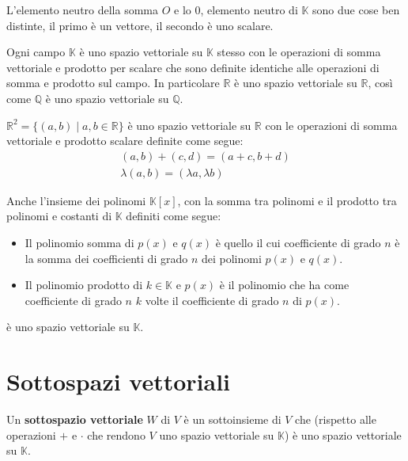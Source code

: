\begin{observation}
	L'elemento neutro della somma $O$ e lo $0$, elemento neutro di $\mathbb{K}$
	sono due cose ben distinte, il primo è un vettore, il secondo è uno scalare.
\end{observation}

\begin{example}
	Ogni campo $\mathbb{K}$ \`e uno spazio vettoriale su $\mathbb{K}$
	stesso con le operazioni di somma vettoriale e prodotto per scalare
	che sono definite identiche alle operazioni di somma e prodotto sul
	campo. In particolare $\mathbb{R}$ \`e uno spazio vettoriale
	su $\mathbb{R}$, cos\`i come $\mathbb{Q}$ \`e uno spazio vettoriale
	su $\mathbb{Q}$.
\end{example}

\begin{example}
	$\mathbb{R}^2 = \{(a, b) \mid a,b \in \mathbb{R}\}$ \`e uno spazio
	vettoriale su $\mathbb{R}$ con le operazioni di somma vettoriale
	e prodotto scalare definite come segue:
	\begin{gather*}
		(a,b) + (c,d) = (a + c, b + d) \\
		\lambda (a, b) = (\lambda a, \lambda b)
	\end{gather*}
\end{example}

\begin{example}
	Anche l'insieme dei polinomi $\mathbb{K}[x]$, con la somma tra
	polinomi e il prodotto tra polinomi e costanti di $\mathbb{K}$
	definiti come segue:
	\begin{itemize}
		\item
		      Il polinomio somma di $p(x)$ e $q(x)$ \`e quello il cui
		      coefficiente di grado $n$ \`e la somma dei coefficienti di grado
		      $n$ dei polinomi $p(x)$ e $q(x)$.
		\item
		      Il polinomio prodotto di $k \in \mathbb{K}$ e $p(x)$ \`e il
		      polinomio che ha come coefficiente di grado $n$ $k$ volte il
		      coefficiente di grado $n$ di $p(x)$.
	\end{itemize}
	\`e uno spazio vettoriale su $\mathbb{K}$.
\end{example}

\section{Sottospazi vettoriali}

\begin{definition}
	Un \textbf{sottospazio vettoriale} $W$ di $V$ \`e un sottoinsieme di $V$
	che (rispetto alle operazioni $+$ e $\cdot$ che rendono $V$
	uno spazio vettoriale su $\mathbb{K}$) \`e uno spazio
	vettoriale su $\mathbb{K}$.
\end{definition}


